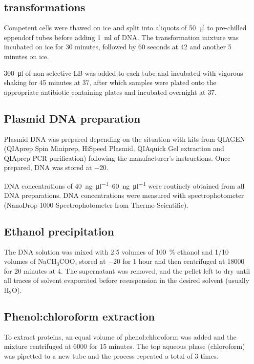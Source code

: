   \subsection{ transformations}
    Competent cells were thawed on ice and split into aliquots of \SI{50}{\ul} to pre-chilled
    eppendorf tubes before adding \SI{1}{\ml} of DNA. The transformation mixture was
    incubated on ice for 30 minutes, followed by 60 seconds at \SI{42}{\dc} and another 5 minutes on ice.
    
    \SI{300}{\ul} of non-selective LB was added to each tube and incubated with vigorous
    shaking for 45 minutes at \SI{37}{\dc}, after which samples were plated onto the appropriate
    antibiotic containing plates and incubated overnight at \SI{37}{\dc}.

  \subsection{Plasmid DNA preparation}
    Plasmid DNA was prepared depending on the situation with kits from QIAGEN (QIAprep Spin Miniprep,
    HiSpeed Plasmid, QIAquick Gel extraction and QIAprep PCR purification) following the
    manufacturer's instructions. Once prepared, DNA was stored at \SI{-20}{\dc}.
    
    DNA concentrations of \SIrange{40}{60}{\ng\per\ul} were routinely obtained from all DNA
    preparations. DNA concentrations were measured with spectrophotometer (NanoDrop 1000 Spectrophotometer
    from Thermo Scientific).

  \subsection{Ethanol precipitation}
    \label{sec:ethanol-precipitation}
    The DNA solution was mixed with \num{2.5} volumes of \SI{100}{\percent} ethanol and \num{1/10} volumes
    of NaCH$_3$COO, stored at \SI{-20}{\dc} for 1 hour and then centrifuged at \SI{18000}{\gn} for
    20 minutes at \SI{4}{\dc}. The supernatant was removed, and the pellet left to dry until all
    traces of solvent evaporated before resuspension in the desired solvent (usually
    H$_2$O).

  \subsection{Phenol:chloroform extraction}
    \label{sec:phenol-extraction}
    To extract proteins, an equal volume of phenol:chloroform was added and the
    mixture centrifuged at \SI{6000}{\gn} for 15 minutes. The top aqueous phase (chloroform)
    was pipetted to a new tube and the process repeated a total of 3 times.

